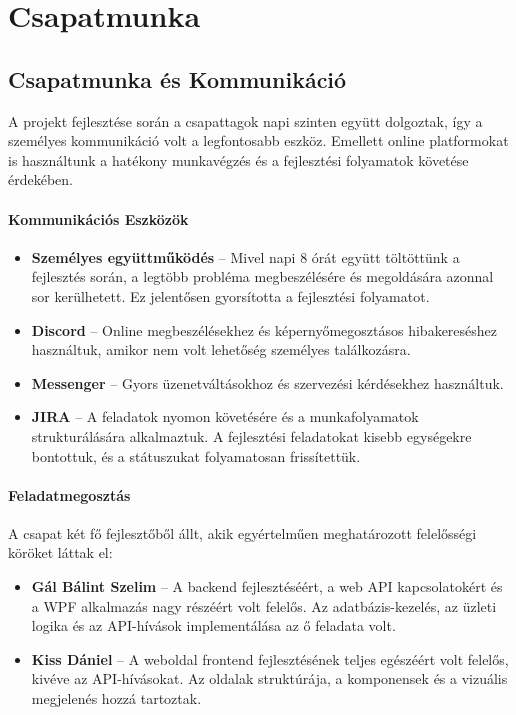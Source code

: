 \documentclass{report}[11pt]
\begin{document}
    \chapter{Csapatmunka}
    \section{Csapatmunka és Kommunikáció}

A projekt fejlesztése során a csapattagok napi szinten együtt dolgoztak, így a személyes kommunikáció volt a legfontosabb eszköz. Emellett online platformokat is használtunk a hatékony munkavégzés és a fejlesztési folyamatok követése érdekében.

\subsubsection{Kommunikációs Eszközök}

\begin{itemize}
    \item \textbf{Személyes együttműködés} – Mivel napi 8 órát együtt töltöttünk a fejlesztés során, a legtöbb probléma megbeszélésére és megoldására azonnal sor kerülhetett. Ez jelentősen gyorsította a fejlesztési folyamatot.
    \item \textbf{Discord} – Online megbeszélésekhez és képernyőmegosztásos hibakereséshez használtuk, amikor nem volt lehetőség személyes találkozásra.
    \item \textbf{Messenger} – Gyors üzenetváltásokhoz és szervezési kérdésekhez használtuk.
    \item \textbf{JIRA} – A feladatok nyomon követésére és a munkafolyamatok strukturálására alkalmaztuk. A fejlesztési feladatokat kisebb egységekre bontottuk, és a státuszukat folyamatosan frissítettük.
\end{itemize}

\subsubsection{Feladatmegosztás}

A csapat két fő fejlesztőből állt, akik egyértelműen meghatározott felelősségi köröket láttak el:

\begin{itemize}
    \item \textbf{Gál Bálint Szelim} – A backend fejlesztéséért, a web API kapcsolatokért és a WPF alkalmazás nagy részéért volt felelős. Az adatbázis-kezelés, az üzleti logika és az API-hívások implementálása az ő feladata volt.
    \item \textbf{Kiss Dániel} – A weboldal frontend fejlesztésének teljes egészéért volt felelős, kivéve az API-hívásokat. Az oldalak struktúrája, a komponensek és a vizuális megjelenés hozzá tartoztak.
\end{itemize}
\end{document}

